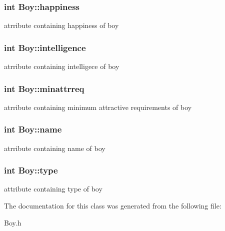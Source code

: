 \subsubsection[{\texorpdfstring{happiness}{happiness}}]{\setlength{\rightskip}{0pt plus 5cm}int Boy\+::happiness}\hypertarget{classBoy_adaf15f15972678dbd77e8b8b319d5767}{}\label{classBoy_adaf15f15972678dbd77e8b8b319d5767}
atrribute containing happiness of boy 
\subsubsection[{\texorpdfstring{intelligence}{intelligence}}]{\setlength{\rightskip}{0pt plus 5cm}int Boy\+::intelligence}\hypertarget{classBoy_a10f24ab1e3dbee6fac2a122c76954fa5}{}\label{classBoy_a10f24ab1e3dbee6fac2a122c76954fa5}
atrribute containing intelligece of boy 
\subsubsection[{\texorpdfstring{minattrreq}{minattrreq}}]{\setlength{\rightskip}{0pt plus 5cm}int Boy\+::minattrreq}\hypertarget{classBoy_a27a29b1780caee1e017280bc08405662}{}\label{classBoy_a27a29b1780caee1e017280bc08405662}
atrribute containing minimum attractive requirements of boy 
\subsubsection[{\texorpdfstring{name}{name}}]{\setlength{\rightskip}{0pt plus 5cm}int Boy\+::name}\hypertarget{classBoy_ae4e7057e134fc1ad61aa245220b01e5a}{}\label{classBoy_ae4e7057e134fc1ad61aa245220b01e5a}
atrribute containing name of boy 
\subsubsection[{\texorpdfstring{type}{type}}]{\setlength{\rightskip}{0pt plus 5cm}int Boy\+::type}\hypertarget{classBoy_a1b907f52b73e8355ce0dd02db65afa4f}{}\label{classBoy_a1b907f52b73e8355ce0dd02db65afa4f}
attribute containing type of boy 

The documentation for this class was generated from the following file\+:\begin{DoxyCompactItemize}
\item 
Boy.\+h\end{DoxyCompactItemize}
